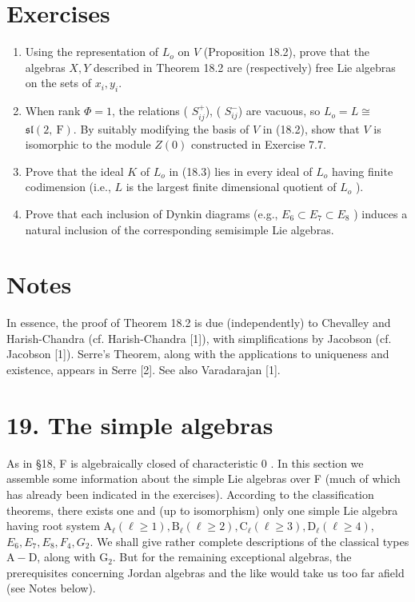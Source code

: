 \documentclass[10pt]{article}
\begin{document}
\section*{Exercises}
\begin{enumerate}
  \item Using the representation of $L_{o}$ on $V$ (Proposition 18.2), prove that the algebras $X, Y$ described in Theorem 18.2 are (respectively) free Lie algebras on the sets of $x_{i}, y_{i}$.
  \item When rank $\Phi=1$, the relations ( $S_{i j}^{+}$), ( $S_{i j}^{-}$) are vacuous, so $L_{o}=L \cong$ $\mathfrak{s l}(2, \mathrm{~F})$. By suitably modifying the basis of $V$ in (18.2), show that $V$ is isomorphic to the module $Z(0)$ constructed in Exercise 7.7.
  \item Prove that the ideal $K$ of $L_{o}$ in (18.3) lies in every ideal of $L_{o}$ having finite codimension (i.e., $L$ is the largest finite dimensional quotient of $L_{o}$ ).
  \item Prove that each inclusion of Dynkin diagrams (e.g., $E_{6} \subset E_{7} \subset E_{8}$ ) induces a natural inclusion of the corresponding semisimple Lie algebras.
\end{enumerate}

\section*{Notes}
In essence, the proof of Theorem 18.2 is due (independently) to Chevalley and Harish-Chandra (cf. Harish-Chandra [1]), with simplifications by Jacobson (cf. Jacobson [1]). Serre's Theorem, along with the applications to uniqueness and existence, appears in Serre [2]. See also Varadarajan [1].

\section*{19. The simple algebras}
As in §18, F is algebraically closed of characteristic 0 . In this section we assemble some information about the simple Lie algebras over F (much of which has already been indicated in the exercises). According to the classification theorems, there exists one and (up to isomorphism) only one simple Lie algebra having root system $\mathrm{A}_{\ell}(\ell \geq 1), \mathrm{B}_{\ell}(\ell \geq 2), \mathrm{C}_{\ell}(\ell \geq 3), \mathrm{D}_{\ell}(\ell \geq 4)$, $E_{6}, E_{7}, E_{8}, F_{4}, G_{2}$. We shall give rather complete descriptions of the classical types $\mathrm{A}-\mathrm{D}$, along with $\mathrm{G}_{2}$. But for the remaining exceptional algebras, the prerequisites concerning Jordan algebras and the like would take us too far afield (see Notes below).
\end{document}
